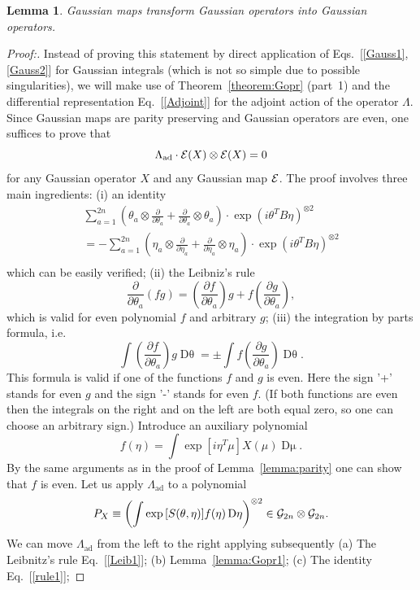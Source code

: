 \documentclass[twocolumn,showpacs,preprintnumbers,superscriptaddress]{revtex4}
\newtheorem{lemma}{Lemma}
\newcommand{\calE}{{\cal E }}
\newcommand{\Gr}{{\cal G}}
\newcommand{\drv}[1]{\frac{\partial}{\partial{#1}}}
\newcommand{\D}[1]{\mathop{\mathrm{D}#1}}
\newcommand{\ad}{{\mathrm{ad}}}
\newcommand{\be}{\begin{equation}}
\newcommand{\ee}{\end{equation}}
\newcommand{\ba}{\begin{array}}
\newcommand{\ea}{\end{array}}
\begin{document}
\begin{lemma}\label{lemma:Gmap}
Gaussian maps transform Gaussian operators into Gaussian operators.
\end{lemma}
\begin{proof}[Proof:]
Instead of proving this statement by direct application of 
Eqs.~[\ref{Gauss1},\ref{Gauss2}] for
Gaussian integrals (which is not so simple due to possible singularities), 
we will make use of Theorem~\ref{theorem:Gopr} (part~1) and the differential 
representation Eq.~[\ref{Adjoint}] for the adjoint action of 
the operator $\Lambda$. Since Gaussian maps are parity preserving 
and Gaussian operators are even, one suffices to prove that
\be\label{to_be_tested}
\Lambda_{\ad}\cdot  \calE(X)\otimes \calE(X) =0
\ee
for any Gaussian operator $X$ and any Gaussian map $\calE$.
The proof involves three main ingredients: (i) an identity
\be\label{rule1}
\ba{l}
\sum_{a=1}^{2n}
\left( 
\theta_a\otimes \drv{\theta_a} + \drv{\theta_a}\otimes \theta_a
\right)\cdot 
\exp{\left( i\theta^T B \eta \right) }^{\otimes 2} \\
{} = - \sum_{a=1}^{2n}
\left( 
\eta_a\otimes \drv{\eta_a} + \drv{\eta_a}\otimes \eta_a
\right) \cdot
\exp{\left( i\theta^T B \eta \right) }^{\otimes 2} \\
\ea
\ee
which can be easily verified;  (ii) the Leibniz's rule
\be\label{Leib1}
\drv{\theta_a}(fg)=
\left(\frac{\partial f}{\partial \theta_a}\right) g +
f\left(\frac{\partial g}{\partial \theta_a}\right),
\ee
which is valid for even polynomial $f$ and
arbitrary  $g$; (iii)
the integration by parts formula, i.e.
\be\label{rule2}
\int \left( \frac{\partial f}{\partial \theta_a}\right) g \D{\theta} =
\pm \int f \left( \frac{\partial g}{\partial \theta_a}\right) \D{\theta}.
\ee
This formula is valid if one of the functions $f$ and $g$ is even.
Here the sign '+' stands for even $g$ and the sign '-' stands for even $f$.
(If both functions are even then the integrals on the right and on the left
are both equal zero, so one can choose an arbitrary sign.) 
Introduce an auxiliary polynomial
\[
f(\eta)=
\int \exp{\left[  i\eta^T \mu \right]}
X(\mu) \D{\mu}.
\]
By the same arguments as in the proof of Lemma~\ref{lemma:parity} one can show
that $f$ is even. Let us apply $\Lambda_{\ad}$ to a polynomial
\[
P_X\equiv
\left(
\int
\exp{[S(\theta,\eta)]}f(\eta) \D{\eta}
\right)^{\otimes 2} \in \Gr_{2n}\otimes \Gr_{2n}.
\]
We can move $\Lambda_{\ad}$ from the left to the right applying subsequently
(a) The Leibnitz's rule Eq.~[\ref{Leib1}];
(b) Lemma~\ref{lemma:Gopr1}; (c) The identity Eq.~[\ref{rule1}];

\end{proof}
\end{document}

